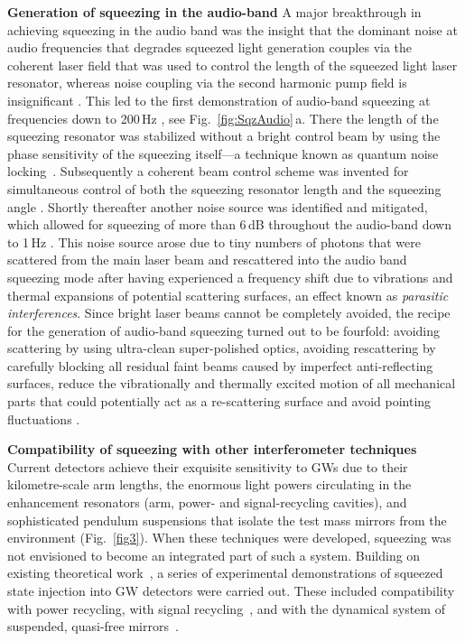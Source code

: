 \textbf{Generation of squeezing in the audio-band}\; A major
breakthrough in achieving squeezing in the audio band was the
insight that the dominant noise at audio frequencies that
degrades squeezed light generation couples via the coherent laser
field that was used to control the length of the squeezed light
laser resonator, whereas noise coupling via the second harmonic
pump field is insignificant \cite{Bowen2002,Schnabel2004}. This led
to the first demonstration of audio-band squeezing at frequencies
down to 200\,Hz \cite{McKenzie2004}, see Fig.~\ref{fig:SqzAudio}\,a. There the length of the squeezing
resonator was stabilized without a bright control beam by using the phase sensitivity of the squeezing itself---a technique known as quantum noise locking~\cite{McKenzie2005}. Subsequently a coherent beam control scheme was invented \cite{Vahlbruch2006} for simultaneous control of both the squeezing resonator length and the squeezing angle \cite{GerryKnight}. Shortly thereafter another noise source was
identified and mitigated, which allowed for squeezing of more than
6\,dB throughout the audio-band down to 1\,Hz \cite{Vahlbruch2007}. This
noise source arose due to tiny numbers of photons that were
scattered from the main laser beam and rescattered into the audio
band squeezing mode after having experienced a frequency shift due
to vibrations and thermal expansions of potential scattering
surfaces, an effect known as \textit{parasitic interferences}. Since
bright laser beams cannot be completely avoided, the recipe for the
generation of audio-band squeezing turned out to be fourfold:
avoiding scattering by using ultra-clean super-polished optics,
avoiding rescattering by carefully blocking all residual faint beams
caused by imperfect anti-reflecting surfaces, reduce the
vibrationally and thermally excited motion of all mechanical parts
that could potentially act as a re-scattering surface and avoid pointing fluctuations \cite{McKenzie2007}.

\textbf{Compatibility of squeezing with other interferometer techniques}\; Current detectors achieve their exquisite
sensitivity to GWs due to their kilometre-scale arm lengths, the
enormous light powers circulating in the enhancement resonators
(arm, power- and signal-recycling cavities),
and sophisticated pendulum suspensions that isolate the test mass
mirrors from the environment (Fig.~\ref{fig3}).
When these
techniques were developed, squeezing was not envisioned to become an
integrated part of such a system. Building on existing theoretical
work~\cite{Gea-Banacloche1987,OpticalSpringHarms2003}, a series of experimental demonstrations
of squeezed state injection into GW detectors were carried out.
These included compatibility with power recycling, with signal
recycling~\cite{McKenzie2002,Vahlbruch2005}, and with the dynamical system of
suspended, quasi-free mirrors~\cite{Goda2008,Schnabel2008}.



